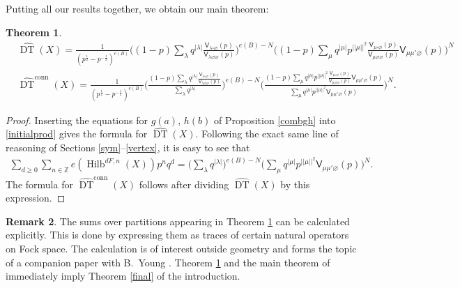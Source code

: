 \documentclass{amsart}
\newtheorem{theorem}{Theorem}%
\theoremstyle{definition}
\newtheorem{remark}[theorem]{Remark}
\newcommand{\ZZ} {\mathbb{Z}}		%
\newcommand{\sfV}{\mathsf{V}}
\newcommand{\Hilb}{\operatorname{Hilb}}
\newcommand{\DT}{\operatorname{DT}}
\newcommand{\conn}{\operatorname{conn}}
\begin{document}
Putting all our results together, we obtain our main theorem:
\begin{theorem} \label{main}
\begin{align*}
&\widehat{\DT}(X) = \frac{1}{(p^{\frac{1}{2}} - p^{-\frac{1}{2}})^{e(B)}} \Bigg( (1-p) \sum_{\lambda} q^{|\lambda|} \frac{\sfV_{\lambda\square\varnothing}(p)}{\sfV_{\lambda\varnothing\varnothing}(p)} \Bigg)^{e(B) - N}  \Bigg( (1-p) \sum_{\mu}  q^{|\mu|} p^{|\!|\mu|\!|^2} \frac{\sfV_{\mu\square\varnothing}(p)}{\sfV_{\mu\varnothing\varnothing}(p)} \sfV_{\mu\mu'\varnothing}(p) \Bigg)^{N} \\
&\widehat{\DT}^{\conn}(X) = \frac{1}{(p^{\frac{1}{2}} - p^{-\frac{1}{2}})^{e(B)}} \Bigg( \frac{(1-p) \sum_{\lambda} q^{|\lambda|} \frac{\sfV_{\lambda\square\varnothing}(p)}{\sfV_{\lambda\varnothing\varnothing}(p)}}{\sum_{\lambda} q^{|\lambda|}} \Bigg)^{e(B) - N}  \Bigg( \frac{(1-p) \sum_{\mu}  q^{|\mu|} p^{|\!|\mu|\!|^2} \frac{\sfV_{\mu\square\varnothing}(p)}{\sfV_{\mu\varnothing\varnothing}(p)} \sfV_{\mu\mu'\varnothing}(p)}{\sum_{\mu} q^{|\mu|} p^{|\!|\mu|\!|^2} \sfV_{\mu\mu'\varnothing}(p)} \Bigg)^{N}.
\end{align*}
\end{theorem}
\begin{proof}
Inserting the equations for $g(a)$, $h(b)$ of Proposition \ref{combgh} into \eqref{initialprod} gives the formula for $\widehat{\DT}(X)$. Following the exact same line of reasoning of Sections \ref{sym}--\ref{vertex}, it is easy to see that
\begin{align*}
\sum_{d \geq 0} \sum_{n \in \ZZ} e(\Hilb^{dF,n}(X)) p^n q^d = \Bigg( \sum_{\lambda} q^{|\lambda|} \Bigg)^{e(B) - N} \Bigg( \sum_{\mu} q^{|\mu|} p^{|\!|\mu|\!|^2} \sfV_{\mu\mu'\varnothing}(p) \Bigg)^{N}.
\end{align*}
The formula for $\widehat{\DT}^{\conn}(X)$ follows after dividing $\widehat{\DT}(X)$ by this expression.
\end{proof}

\begin{remark}
The sums over partitions appearing in Theorem \ref{main} can be calculated explicitly. This is done by expressing them as traces of certain natural operators on Fock space. The calculation is of interest outside geometry and forms the topic of a companion paper with B.~Young \cite{BKY}. Theorem \ref{main} and the main theorem of \cite{BKY} immediately imply Theorem \ref{final} of the introduction. 
\end{remark}
\end{document}
